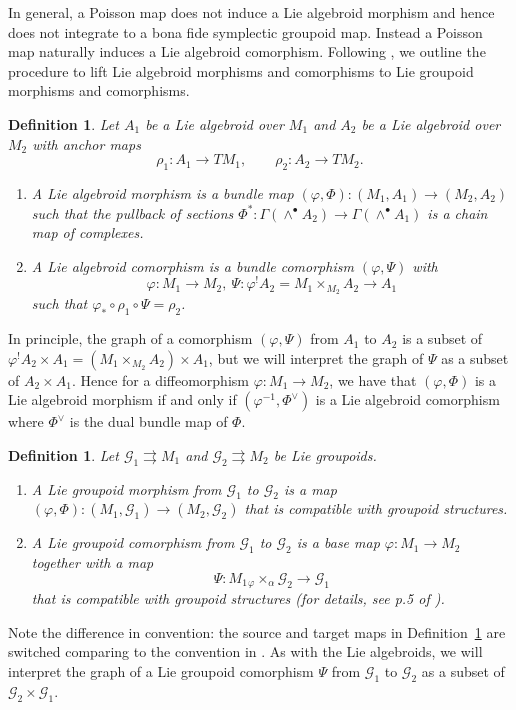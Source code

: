 \documentclass{amsart}
\newtheorem{definition}[theorem]{Definition}
\numberwithin{equation}{section}
\newcommand{\cG}{\mathcal{G}}
\newcommand{\rra}{\rightrightarrows}
\begin{document}
In general, a Poisson map does not induce a Lie algebroid morphism and hence does not integrate to a bona fide symplectic groupoid map.
Instead a Poisson map naturally induces a Lie algebroid comorphism.
Following \cite{CDW13}, we outline the procedure to lift Lie algebroid morphisms and comorphisms to Lie groupoid morphisms and comorphisms.
\begin{definition} 
  \cite{HM90, Mac05, CDW13}
 	Let $A_1$ be a Lie algebroid over $M_1$ and $A_2$ be a Lie algebroid over $M_2$ with anchor maps
 	\[ \rho_1: A_1 \to TM_1, \qquad \rho_2: A_2 \to TM_2. \]
 	\begin{enumerate}
 		\item A Lie algebroid morphism is a bundle map $(\varphi, \Phi): (M_1, A_1) \to (M_2, A_2)$ such that the pullback of sections $\Phi^*: \Gamma(\wedge^\bullet A_2) \to \Gamma(\wedge^\bullet A_1)$ is a chain map of complexes.
 		\item A Lie algebroid comorphism is a bundle comorphism $(\varphi, \Psi)$ with
 			\[ \varphi: M_1 \to M_2,~ \Psi: \varphi^! A_2 = M_1 {\times_{M_2}} A_2 \to A_1 \]
 			such that $\varphi_* \circ \rho_1 \circ \Psi = \rho_2$. 
 	\end{enumerate}
\end{definition}
In principle, the graph of a comorphism $(\varphi, \Psi)$ from $A_1$ to $A_2$ is a subset of $\varphi^! A_2 \times A_1 = \left(M_1 {\times_{M_2}} A_2 \right) \times A_1$, but we will interpret the graph of $\Psi$ as a subset of $A_2 \times A_1$. Hence for a diffeomorphism $\varphi: M_1 \to M_2$, we have that $(\varphi, \Phi)$ is a Lie algebroid morphism if and only if $(\varphi^{-1}, \Phi^\vee)$ is a Lie algebroid comorphism where $\Phi^\vee$ is the dual bundle map of $\Phi$.
\begin{definition} 
  \cite{Mac05, CDW13} 
  \label{def:gpdcomor}
  Let $\cG_1 \rra M_1$ and $\cG_2 \rra M_2$ be Lie groupoids.
  \begin{enumerate}
    \item A Lie groupoid morphism from $\cG_1$ to $\cG_2$ is a map $(\varphi, \Phi): (M_1, \cG_1) \to (M_2, \cG_2)$ that is compatible with groupoid structures. 
    \item A Lie groupoid comorphism from $\cG_1$ to $\cG_2$ is a base map $\varphi: M_1 \to M_2$ together with a map
      \[ \Psi: M_1 {_\varphi \times_\alpha} \cG_2 \to \cG_1 \]
      that is compatible with groupoid structures (for details, see p.5 of \cite{CDW13}). 
  \end{enumerate}
\end{definition}
Note the difference in convention: the source and target maps in Definition~\ref{def:gpdcomor} are switched comparing to the convention in \cite{CDW13}.
As with the Lie algebroids, we will interpret the graph of a Lie groupoid comorphism $\Psi$ from $\cG_1$ to $\cG_2$ as a subset of $\cG_2 \times \cG_1$.
\end{document}
